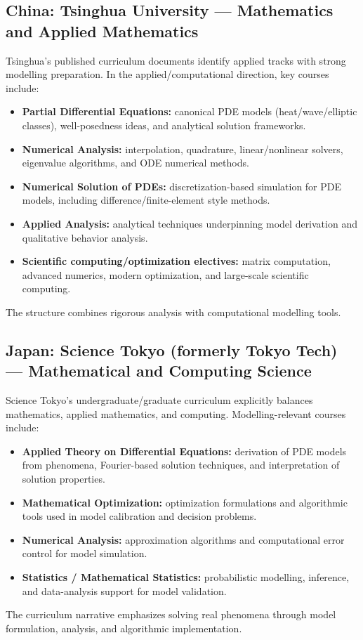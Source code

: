 ﻿\documentclass[11pt,a4paper]{article}
\begin{document}
\subsection*{China: Tsinghua University --- Mathematics and Applied Mathematics}
Tsinghua's published curriculum documents identify applied tracks with strong modelling preparation. In the applied/computational direction, key courses include:
\begin{itemize}[leftmargin=*]
  \item \textbf{Partial Differential Equations:} canonical PDE models (heat/wave/elliptic classes), well-posedness ideas, and analytical solution frameworks.
  \item \textbf{Numerical Analysis:} interpolation, quadrature, linear/nonlinear solvers, eigenvalue algorithms, and ODE numerical methods.
  \item \textbf{Numerical Solution of PDEs:} discretization-based simulation for PDE models, including difference/finite-element style methods.
  \item \textbf{Applied Analysis:} analytical techniques underpinning model derivation and qualitative behavior analysis.
  \item \textbf{Scientific computing/optimization electives:} matrix computation, advanced numerics, modern optimization, and large-scale scientific computing.
\end{itemize}
The structure combines rigorous analysis with computational modelling tools.

\subsection*{Japan: Science Tokyo (formerly Tokyo Tech) --- Mathematical and Computing Science}
Science Tokyo's undergraduate/graduate curriculum explicitly balances mathematics, applied mathematics, and computing. Modelling-relevant courses include:
\begin{itemize}[leftmargin=*]
  \item \textbf{Applied Theory on Differential Equations:} derivation of PDE models from phenomena, Fourier-based solution techniques, and interpretation of solution properties.
  \item \textbf{Mathematical Optimization:} optimization formulations and algorithmic tools used in model calibration and decision problems.
  \item \textbf{Numerical Analysis:} approximation algorithms and computational error control for model simulation.
  \item \textbf{Statistics / Mathematical Statistics:} probabilistic modelling, inference, and data-analysis support for model validation.
\end{itemize}
The curriculum narrative emphasizes solving real phenomena through model formulation, analysis, and algorithmic implementation.
\end{document}
